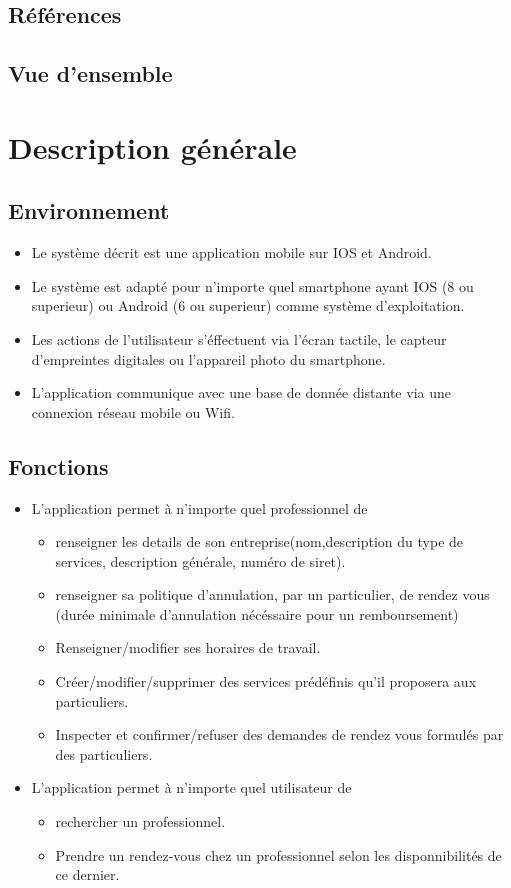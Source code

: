 \documentclass{article}
\begin{document}
\subsection{Références}

\subsection{Vue d'ensemble}


\section{Description générale}
\subsection{Environnement}
\begin{itemize}
\item Le système décrit est une application mobile sur IOS et
Android.
\item Le système est adapté pour n'importe quel smartphone ayant IOS (8 ou superieur) ou Android (6 ou superieur) comme
système d'exploitation.
\item Les actions de l'utilisateur s'éffectuent via l'écran
  tactile, le capteur d'empreintes digitales ou l'appareil photo du smartphone.
\item L'application communique avec une base de donnée distante
  via une connexion \og réseau mobile\fg{} ou Wifi.


\end{itemize}
\subsection{Fonctions}
\begin{itemize}
\item L'application permet à n'importe quel professionnel de 

	\begin{itemize}
	\item renseigner les details de son entreprise(nom,description du
	type de services, description générale, numéro de siret).
	\item renseigner sa politique d'annulation, par un particulier, de rendez vous (durée minimale d'annulation nécéssaire pour un remboursement)
	\item Renseigner/modifier ses horaires de travail.
	\item Créer/modifier/supprimer des services prédéfinis qu'il proposera aux particuliers.
	\item Inspecter et confirmer/refuser des demandes de rendez vous formulés par des particuliers.
	\end{itemize}
\item L'application permet à n'importe quel utilisateur de

 	\begin{itemize}
	\item rechercher un professionnel.
	\item Prendre un rendez-vous chez un professionnel selon les disponnibilités de
	ce dernier.
	\end{itemize}
\end{itemize}
\end{document}
